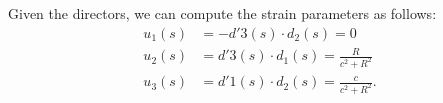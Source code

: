 \documentclass[11pt,letterpaper]{amsart}
\begin{document}
Given the directors, we can compute the strain parameters as follows:
\begin{align*}
	u_1(s) &= -d'3(s) \cdot d_2(s) = 0 \\
	u_2(s) &=  d'3(s) \cdot d_1(s) = \frac{R}{c^2 + R^2} \\
	u_3(s) &=  d'1(s) \cdot d_2(s) = \frac{c}{c^2 + R^2}.
\end{align*}
%
%
%
%
%
%
\end{document}
